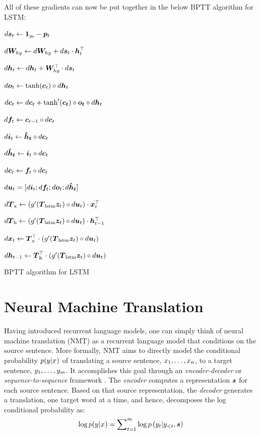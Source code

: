 All of these gradients can now be put together in the below BPTT algorithm for LSTM:
\begin{algorithm}
\label{a:lstm}
{
$d\bm{s}_{t} \leftarrow \bm{1}_{y_t} - \bm{p}_{t}$

$d\bm{W}_{hy} \leftarrow d\bm{W}_{hy} + d\bm{s}_{t} \cdot \bm{h}_{t}^\top$

$d\bm{h}_{t} \leftarrow d\bm{h}_{t} + \bm{W}_{hy}^\top \cdot d\bm{s}_{t}$

$d\bm{o}_{t} \leftarrow \tanh(\bm{c}_{t}) \circ d\bm{h}_{t}$

$d\bm{c}_{t} \leftarrow d\bm{c}_{t} + \tanh'(\bm{\bm{c}_{t}}) \circ \bm{\bm{o}_{t}} \circ d\bm{h}_{t}$ 

$d\bm{f}_{t} \leftarrow \bm{c}_{t-1} \circ d\bm{c}_{t}$

$d\bm{i}_{t} \leftarrow \mbox{\boldmath{$\hat{h}_t$}} \circ d\bm{c}_{t}$

$d\mbox{\boldmath{$\hat{h}_t$}} \leftarrow \bm{i}_{t} \circ d\bm{c}_{t}$

$d\bm{c}_{t} \leftarrow \bm{f}_{t} \circ d\bm{c}_{t}$ 

$d\bm{u}_t = [d\bm{i}_{t}; d\bm{f}_{t}; d\bm{o}_{t}; d\mbox{\boldmath{$\hat{h}_t$}}]$

$d\mbox{\boldmath{$T$}}_{\text{x}} \leftarrow \left(g'(\mbox{\boldmath{$T$}}_{\text{lstm}} \bm{z}_{t}) \circ d\bm{u}_t\right) \cdot \bm{x}_{t}^\top$

$d\mbox{\boldmath{$T$}}_{\text{h}} \leftarrow  \left(g'(\mbox{\boldmath{$T$}}_{\text{lstm}} \bm{z}_{t}) \circ d\bm{u}_t\right) \cdot \bm{h}_{t-1}^\top$

$d\bm{x}_{t} \leftarrow  \mbox{\boldmath{$T$}}_{\text{x}}^\top \cdot \left(g'(\mbox{\boldmath{$T$}}_{\text{lstm}} \bm{z}_{t}) \circ d\bm{u}_t\right)$

$d\bm{h}_{t-1} \leftarrow  \mbox{\boldmath{$T$}}_{\text{h}}^\top \cdot \left(g'(\mbox{\boldmath{$T$}}_{\text{lstm}} \bm{z}_{t}) \circ d\bm{u}_t\right)$
}
\caption{BPTT algorithm for LSTM}
\label{a:lstm_bptt}
\end{algorithm}

\section{Neural Machine Translation}
Having introduced recurrent language models, one can simply think of
neural machine translation (NMT) as a recurrent language model that conditions
on the source sentence. More formally, NMT aims to directly model the
conditional probability $p(y_{}|x_{})$ of translating
a source sentence, $x_{1},\ldots,x_{n}$, to a target sentence, $y_{1},\ldots,y_{m}$.
It accomplishes this goal through an {\it encoder-decoder} or {\it
sequence-to-sequence} framework
\cite{kal13,sutskever14,cho14}. The {\it encoder} computes a representation $\mbox{\boldmath{$s$}}$
for each source sentence. Based on that source representation,
the {\it decoder} generates a translation, one target word at a time, and hence,
decomposes the log conditional probability as:
\begin{equation}
\log p(y_{}|x_{}) = \sum_{t=1}^m \nolimits \log
p\left(y_{t}|y_{<t},\mbox{\boldmath{$s$}}\right)
\label{e:s2s}
\end{equation}

